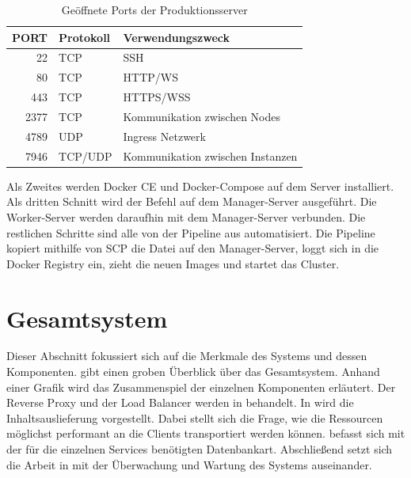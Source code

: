 \begin{table}[h]
\begin{center}
\begin{tabular}{rll}
PORT & Protokoll & Verwendungszweck\\
\hline
22 & TCP & SSH\\
80 & TCP & HTTP/WS\\
443 & TCP & HTTPS/WSS\\
2377 & TCP & Kommunikation zwischen Nodes\\
4789 & UDP & Ingress Netzwerk\\
7946 & TCP/UDP & Kommunikation zwischen Instanzen\\
\end{tabular}
\end{center}
\caption{Geöffnete Ports der Produktionsserver}
\label{tab:geoeffneteportsderproduktionsserver}
\end{table}

Als Zweites werden Docker CE und Docker\hyp{}Compose
auf dem Server installiert. Als dritten Schnitt wird der Befehl
   auf dem Manager-Server
ausgeführt. Die Worker-Server werden daraufhin mit dem Manager-Server verbunden.
Die restlichen Schritte sind alle von der Pipeline aus automatisiert. Die Pipeline
kopiert mithilfe von SCP die  Datei auf den Manager-Server,
loggt sich in die Docker Registry ein, zieht die neuen Images und startet das Cluster.

\section{Gesamtsystem}
\label{sec:gesamtsysten}
Dieser Abschnitt fokussiert sich auf die Merkmale des Systems und dessen
Komponenten.  gibt einen groben Überblick über
das Gesamtsystem. Anhand einer Grafik wird das Zusammenspiel
der einzelnen Komponenten erläutert. Der Reverse Proxy und der Load Balancer
werden in  behandelt. In
 wird die Inhaltsauslieferung
vorgestellt. Dabei stellt sich die Frage, wie die Ressourcen
möglichst performant an die Clients transportiert werden können.
 befasst sich mit der für die einzelnen
Services benötigten Datenbankart. Abschließend setzt sich die Arbeit
in  mit der Überwachung und Wartung
des Systems auseinander.

